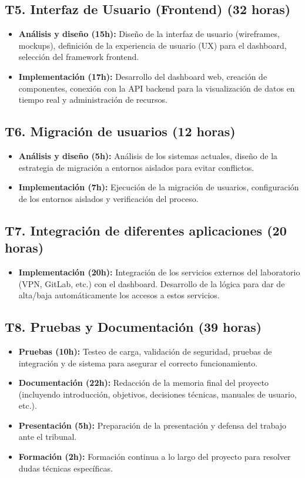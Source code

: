 \documentclass[11pt,a4paper]{article}
\begin{document}
\subsection*{T5. Interfaz de Usuario (Frontend) (32 horas)}
\begin{itemize}
    \item \textbf{Análisis y diseño (15h):} Diseño de la interfaz de usuario (wireframes, mockups), definición de la experiencia de usuario (UX) para el dashboard, selección del framework frontend.
    \item \textbf{Implementación (17h):} Desarrollo del dashboard web, creación de componentes, conexión con la API backend para la visualización de datos en tiempo real y administración de recursos.
\end{itemize}

\subsection*{T6. Migración de usuarios (12 horas)}
\begin{itemize}
    \item \textbf{Análisis y diseño (5h):} Análisis de los sistemas actuales, diseño de la estrategia de migración a entornos aislados para evitar conflictos.
    \item \textbf{Implementación (7h):} Ejecución de la migración de usuarios, configuración de los entornos aislados y verificación del proceso.
\end{itemize}

\subsection*{T7. Integración de diferentes aplicaciones (20 horas)}
\begin{itemize}
    \item \textbf{Implementación (20h):} Integración de los servicios externos del laboratorio (VPN, GitLab, etc.) con el dashboard. Desarrollo de la lógica para dar de alta/baja automáticamente los accesos a estos servicios.
\end{itemize}

\subsection*{T8. Pruebas y Documentación (39 horas)}
\begin{itemize}
    \item \textbf{Pruebas (10h):} Testeo de carga, validación de seguridad, pruebas de integración y de sistema para asegurar el correcto funcionamiento.
    \item \textbf{Documentación (22h):} Redacción de la memoria final del proyecto (incluyendo introducción, objetivos, decisiones técnicas, manuales de usuario, etc.).
    \item \textbf{Presentación (5h):} Preparación de la presentación y defensa del trabajo ante el tribunal.
    \item \textbf{Formación (2h):} Formación continua a lo largo del proyecto para resolver dudas técnicas específicas.
\end{itemize}
\end{document}
